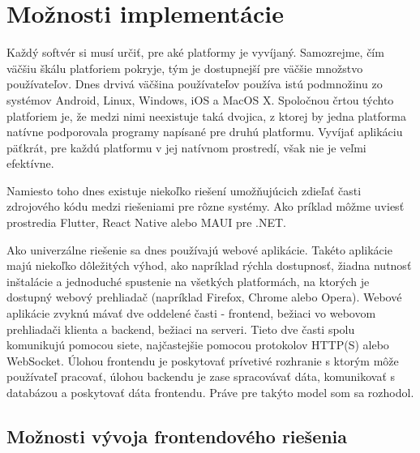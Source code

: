 \chapter{Možnosti implementácie}

\label{kap:moznosti_implementacie}

Každý softvér si musí určiť, pre aké platformy je vyvíjaný. Samozrejme, čím väčšiu škálu platforiem pokryje,
tým je dostupnejší pre väčšie množstvo používateľov. Dnes drvivá väčšina používateľov používa istú podmnožinu
zo systémov Android, Linux, Windows, iOS a MacOS X. Spoločnou črtou týchto platforiem je, že medzi nimi neexistuje taká dvojica,
z ktorej by jedna platforma natívne podporovala programy napísané pre druhú platformu. Vyvíjať aplikáciu päťkrát,
pre každú platformu v jej natívnom prostredí, však nie je veľmi efektívne. 

Namiesto toho dnes existuje niekoľko riešení umožňujúcich zdieľať časti zdrojového kódu medzi riešeniami pre rôzne systémy.
Ako príklad môžme uviesť prostredia Flutter, React Native alebo MAUI pre .NET.

Ako univerzálne riešenie sa dnes používajú webové aplikácie.
Takéto aplikácie majú niekoľko dôležitých výhod, ako napríklad rýchla dostupnosť, žiadna nutnosť inštalácie a jednoduché spustenie
na všetkých platformách, na ktorých je dostupný webový prehliadač (napríklad Firefox, Chrome alebo Opera).
Webové aplikácie zvyknú mávať dve oddelené časti - frontend, bežiaci vo webovom prehliadači klienta a backend,
bežiaci na serveri. Tieto dve časti spolu komunikujú pomocou siete, najčastejšie pomocou protokolov HTTP(S) alebo WebSocket.
Úlohou frontendu je poskytovať prívetivé rozhranie s ktorým môže používateľ pracovať, úlohou backendu je zase spracovávať dáta,
komunikovať s databázou a poskytovať dáta frontendu. Práve pre takýto model som sa rozhodol.

\section{Možnosti vývoja frontendového riešenia}

